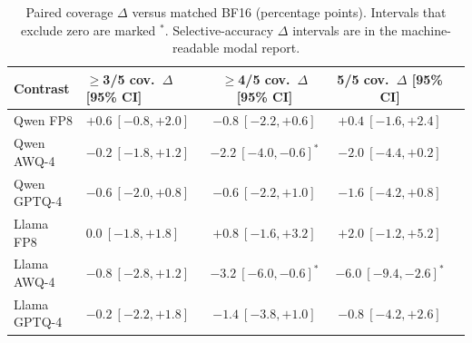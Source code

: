 \documentclass[11pt,a4paper]{article}
\begin{document}
\begin{table}[!htbp]
\centering
\caption{Paired coverage $\Delta$ versus matched BF16 (percentage points). Intervals that exclude zero are marked $^*$. Selective-accuracy $\Delta$ intervals are in the machine-readable modal report.}
\label{tab:modal-paired}
\small
\begin{tabular}{llccc}
\toprule
\textbf{Contrast} & $\ge$3/5 cov.\ $\Delta$ [95\% CI] & $\ge$4/5 cov.\ $\Delta$ [95\% CI] & 5/5 cov.\ $\Delta$ [95\% CI] \\
\midrule
Qwen FP8     & $+0.6\ [-0.8,+2.0]$ & $-0.8\ [-2.2,+0.6]$ & $+0.4\ [-1.6,+2.4]$ \\
Qwen AWQ-4   & $-0.2\ [-1.8,+1.2]$ & $-2.2\ [-4.0,-0.6]^*$ & $-2.0\ [-4.4,+0.2]$ \\
Qwen GPTQ-4  & $-0.6\ [-2.0,+0.8]$ & $-0.6\ [-2.2,+1.0]$ & $-1.6\ [-4.2,+0.8]$ \\
Llama FP8    & $0.0\ [-1.8,+1.8]$ & $+0.8\ [-1.6,+3.2]$ & $+2.0\ [-1.2,+5.2]$ \\
Llama AWQ-4  & $-0.8\ [-2.8,+1.2]$ & $-3.2\ [-6.0,-0.6]^*$ & $-6.0\ [-9.4,-2.6]^*$ \\
Llama GPTQ-4 & $-0.2\ [-2.2,+1.8]$ & $-1.4\ [-3.8,+1.0]$ & $-0.8\ [-4.2,+2.6]$ \\
\bottomrule
\end{tabular}
\end{table}
\end{document}
